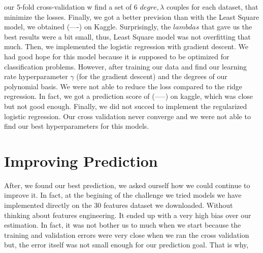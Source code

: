 \documentclass[10pt,conference,compsocconf]{IEEEtran}
\begin{document}
our 5-fold cross-validation w find a set of 6 $degre, \lambda$ couples for each dataset, that minimize the losses. Finally, we got a better prevision than with the Least Square model, we obtained (----) on Kaggle. Surprisingly, the $lambdas$ that gave us the best results were a bit small, thus, Least Square model was not overfitting that much.
Then, we implemented the logistic regression with gradient descent. We had good hope for this model because it is supposed to be optimized for classification problems. However, after training our data and find 
our learning rate  hyperparameter $\gamma$ (for the gradient descent) and the degrees of our polynomial basis. We were not able to reduce the loss compared to the ridge regression. In fact, we got a prediction score of (-----) on kaggle, which was close but not good enough.
Finally, we did not succed to implement the regularized logistic regression. Our cross validation never converge and we were not able to find our best hyperparameters for this models.


\section{Improving Prediction}

After, we found our best prediction, we asked ourself how we could continue to improve it. In fact, at the begining of the challenge we tried models we have implemented directly on the 30 features dataset we downloaded. Without thinking about features engineering. It ended up with a very high bias over our estimation. In fact, it was not bother us to much when we start because the training and validation errors were very close when we ran the cross validation but, the error itself was not small enough for our prediction goal. That is why, \\
\\
\\
\end{document}
